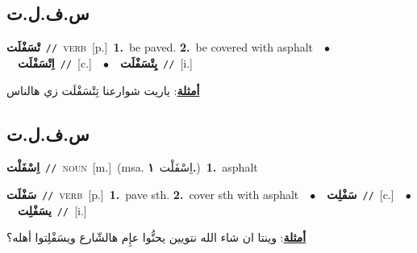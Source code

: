\documentclass[10pt,a4paper,twoside]{article} %
\begin{document}
\begin{multicols}{2}
\vspace{-3mm}
\subsection*{\color{blue}\foreignlanguage{arabic}{س.ف.ل.ت}\color{blue}{}} 

{\setlength\topsep{0pt}\textbf{\foreignlanguage{arabic}{تْسَفْلَت}}\ {\color{gray}\texttt{//}\color{black}}\ \textsc{verb}\ [p.]\ \textbf{1.}~be paved.  \textbf{2.}~be covered with asphalt\ \ $\bullet$\ \ \setlength\topsep{0pt}\textbf{\foreignlanguage{arabic}{اِتْسَفْلَت}}\ {\color{gray}\texttt{//}\color{black}}\ [c.]\ \ $\bullet$\ \ \setlength\topsep{0pt}\textbf{\foreignlanguage{arabic}{يِتْسَفْلَت}}\ {\color{gray}\texttt{//}\color{black}}\ [i.]\  \begin{flushright}\color{gray}\foreignlanguage{arabic}{\textbf{\underline{\foreignlanguage{arabic}{أمثلة}}}: ياريت شوارعنا تِتْسَفْلَت زي هالناس}\end{flushright}\color{black}} \vspace{2mm}

\vspace{-3mm}
\subsection*{\color{blue}\foreignlanguage{arabic}{س.ف.ل.ت}\color{blue}{ (ntws)}} 

{\setlength\topsep{0pt}\textbf{\foreignlanguage{arabic}{اِسْفَلْت}}\ {\color{gray}\texttt{//}\color{black}}\ \textsc{noun}\ [m.]\ \color{gray}(msa. \foreignlanguage{arabic}{اِسْفَلْت}~\foreignlanguage{arabic}{\textbf{١.}})\color{black}\ \textbf{1.}~asphalt\ } \vspace{2mm}

{\setlength\topsep{0pt}\textbf{\foreignlanguage{arabic}{سَفْلَت}}\ {\color{gray}\texttt{//}\color{black}}\ \textsc{verb}\ [p.]\ \textbf{1.}~pave sth.  \textbf{2.}~cover sth with asphalt\ \ $\bullet$\ \ \setlength\topsep{0pt}\textbf{\foreignlanguage{arabic}{سَفْلِت}}\ {\color{gray}\texttt{//}\color{black}}\ [c.]\ \ $\bullet$\ \ \setlength\topsep{0pt}\textbf{\foreignlanguage{arabic}{يسَفْلِت}}\ {\color{gray}\texttt{//}\color{black}}\ [i.]\  \begin{flushright}\color{gray}\foreignlanguage{arabic}{\textbf{\underline{\foreignlanguage{arabic}{أمثلة}}}: وينتا ان شاء الله نتويين يحنُّوا عإِم هالشّارع ويسَفْلِتوا أهله؟}\end{flushright}\color{black}} \vspace{2mm}


\end{multicols}
\end{document}
